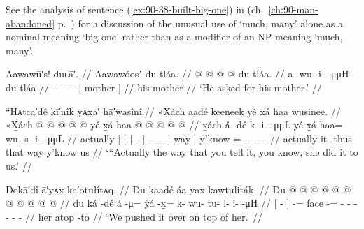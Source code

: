 See the analysis of sentence (\ref{ex:90-38-built-big-one}) in  (ch.\ \ref{ch:90-man-abandoned} p.\ \pageref{ex:90-38-built-big-one}) for a discussion of the unusual use of  ‘much, many’ alone as a nominal meaning ‘big one’ rather than as a modifier of an NP meaning ‘much, many’.

\ex\label{ex:92-141-ask-for-mother}%
%
\begingl
	\glpreamble	Aawawū′s! duʟā′. //
	\glpreamble	Aawawóosʼ du tláa. //
	\gla	{} @ {} @ {} @ {} @ {} {} du tláa. {} //
	\glb	a- wu- i-  -μμH {} du tláa {} //
	\glc	{}- - -  -
		{}[  mother {}] //
	\gld	{} {} {} {} {} {} his mother {} //
	\glft	‘He asked for his mother.’
		//
\endgl
\xe

\ex\label{ex:92-142-way-you-tell-did-to-us}%
%
\begingl
	\glpreamble	“Hᴀtca′dê kī′nîk yᴀxa′ hā′wasînî.//
	\glpreamble	«\!X̱ách aadé keeneek yé x̱á haa wusinee.  //
	\gla	«\!X̱ách {} {} {}  @ {} {}
			 @ {} @ {} @ {} @ {} {} yé {}
		x̱á
		haa @  @ {} @ {} @ {} @ {} //
	\glb	\pqp{}x̱ách {} {} {} á -dé {}
			k- i-  -μμL {} {} yé {}
		x̱á
		haa= wu- s- i-  -μμL //
	\glc	\pqp{}actually {}[ {}[ {}[  - {}]
			- -  - \· {}] way {}]
		y’know
		= - - -  - //
	\gld	\pqp{}actually {} {} {} it -thus {}
			 {} {} {} \·that {}
			way {}
		y’know
		us  {} {} {} {} //
	\glft	‘“Actually the way that you tell it, you know, she did it to us.’
		//
\endgl
\xe

\ex\label{ex:92-143-tipped-it-onto-her}%
%
\begingl
	\glpreamble	Dokā′dî ā′yᴀx ka′otułîtᴀq. //
	\glpreamble	Du kaadé áa yax̱ kawtulitáḵ. //
	\gla	{} Du  @ {} {}
		 @ {} @  @ {} @
		 @ {} @ {} @ {} @ {} @ {} @ {} //
	\glb	{} du ká -dé {}
		á -μ= ÿá -x̱= k- wu- tu- l- i-  -μH //
	\glc	{}[   - {}]
		 -= face -=
		- - - - -  - //
	\gld	{} her atop -to {}
		 {}  {}
		 {} {} {} {} {} {} //
	\glft	‘We pushed it over on top of her.’
		//
\endgl
\xe


